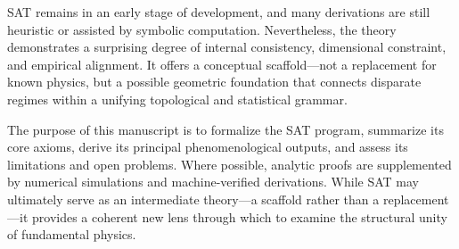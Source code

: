 \documentclass[12pt]{article}
\begin{document}
SAT remains in an early stage of development, and many derivations are still heuristic or assisted by symbolic computation. Nevertheless, the theory demonstrates a surprising degree of internal consistency, dimensional constraint, and empirical alignment. It offers a conceptual scaffold---not a replacement for known physics, but a possible geometric foundation that connects disparate regimes within a unifying topological and statistical grammar.

The purpose of this manuscript is to formalize the SAT program, summarize its core axioms, derive its principal phenomenological outputs, and assess its limitations and open problems. Where possible, analytic proofs are supplemented by numerical simulations and machine-verified derivations. While SAT may ultimately serve as an intermediate theory---a scaffold rather than a replacement---it provides a coherent new lens through which to examine the structural unity of fundamental physics.
\end{document}
